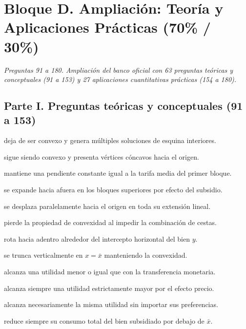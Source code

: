 \section*{Bloque D. Ampliación: Teoría y Aplicaciones Prácticas (70\% / 30\%)}

\noindent\textit{Preguntas 91 a 180. Ampliación del banco oficial con 63 preguntas teóricas y conceptuales (91 a 153) y 27 aplicaciones cuantitativas prácticas (154 a 180).}

\subsection*{Parte I. Preguntas teóricas y conceptuales (91 a 153)}

\begin{opts}
    \item deja de ser convexo y genera múltiples soluciones de esquina interiores.
    \item sigue siendo convexo y presenta vértices cóncavos hacia el origen.
    \item mantiene una pendiente constante igual a la tarifa media del primer bloque.
    \item se expande hacia afuera en los bloques superiores por efecto del subsidio.
\end{opts}

\begin{opts}
    \item se desplaza paralelamente hacia el origen en toda su extensión lineal.
    \item pierde la propiedad de convexidad al impedir la combinación de cestas.
    \item rota hacia adentro alrededor del intercepto horizontal del bien $y$.
    \item se trunca verticalmente en $x=\bar{x}$ manteniendo la convexidad.
\end{opts}

\begin{opts}
    \item alcanza una utilidad menor o igual que con la transferencia monetaria.
    \item alcanza siempre una utilidad estrictamente mayor por el efecto precio.
    \item alcanza necesariamente la misma utilidad sin importar sus preferencias.
    \item reduce siempre su consumo total del bien subsidiado por debajo de $\bar{x}$.
\end{opts}

